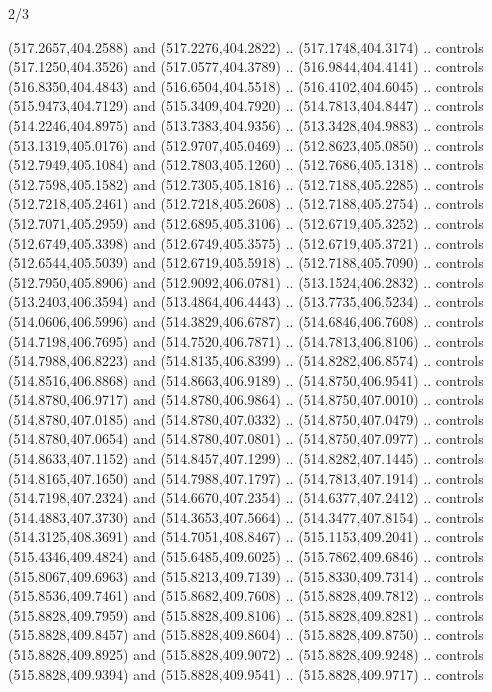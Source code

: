 \begin{flagdescription}{2/3}
\begin{scope}[xshift=0.5\flaglength,yshift=0.5\flagwidth,scale=\flagwidth/495.65]
\begin{scope}[y=0.8pt, x=0.8pt, yscale=-1,shift={(-463.76,-309.78)}]
  (517.2657,404.2588) and (517.2276,404.2822) .. (517.1748,404.3174) .. controls
  (517.1250,404.3526) and (517.0577,404.3789) .. (516.9844,404.4141) .. controls
  (516.8350,404.4843) and (516.6504,404.5518) .. (516.4102,404.6045) .. controls
  (515.9473,404.7129) and (515.3409,404.7920) .. (514.7813,404.8447) .. controls
  (514.2246,404.8975) and (513.7383,404.9356) .. (513.3428,404.9883) .. controls
  (513.1319,405.0176) and (512.9707,405.0469) .. (512.8623,405.0850) .. controls
  (512.7949,405.1084) and (512.7803,405.1260) .. (512.7686,405.1318) .. controls
  (512.7598,405.1582) and (512.7305,405.1816) .. (512.7188,405.2285) .. controls
  (512.7218,405.2461) and (512.7218,405.2608) .. (512.7188,405.2754) .. controls
  (512.7071,405.2959) and (512.6895,405.3106) .. (512.6719,405.3252) .. controls
  (512.6749,405.3398) and (512.6749,405.3575) .. (512.6719,405.3721) .. controls
  (512.6544,405.5039) and (512.6719,405.5918) .. (512.7188,405.7090) .. controls
  (512.7950,405.8906) and (512.9092,406.0781) .. (513.1524,406.2832) .. controls
  (513.2403,406.3594) and (513.4864,406.4443) .. (513.7735,406.5234) .. controls
  (514.0606,406.5996) and (514.3829,406.6787) .. (514.6846,406.7608) .. controls
  (514.7198,406.7695) and (514.7520,406.7871) .. (514.7813,406.8106) .. controls
  (514.7988,406.8223) and (514.8135,406.8399) .. (514.8282,406.8574) .. controls
  (514.8516,406.8868) and (514.8663,406.9189) .. (514.8750,406.9541) .. controls
  (514.8780,406.9717) and (514.8780,406.9864) .. (514.8750,407.0010) .. controls
  (514.8780,407.0185) and (514.8780,407.0332) .. (514.8750,407.0479) .. controls
  (514.8780,407.0654) and (514.8780,407.0801) .. (514.8750,407.0977) .. controls
  (514.8633,407.1152) and (514.8457,407.1299) .. (514.8282,407.1445) .. controls
  (514.8165,407.1650) and (514.7988,407.1797) .. (514.7813,407.1914) .. controls
  (514.7198,407.2324) and (514.6670,407.2354) .. (514.6377,407.2412) .. controls
  (514.4883,407.3730) and (514.3653,407.5664) .. (514.3477,407.8154) .. controls
  (514.3125,408.3691) and (514.7051,408.8467) .. (515.1153,409.2041) .. controls
  (515.4346,409.4824) and (515.6485,409.6025) .. (515.7862,409.6846) .. controls
  (515.8067,409.6963) and (515.8213,409.7139) .. (515.8330,409.7314) .. controls
  (515.8536,409.7461) and (515.8682,409.7608) .. (515.8828,409.7812) .. controls
  (515.8828,409.7959) and (515.8828,409.8106) .. (515.8828,409.8281) .. controls
  (515.8828,409.8457) and (515.8828,409.8604) .. (515.8828,409.8750) .. controls
  (515.8828,409.8925) and (515.8828,409.9072) .. (515.8828,409.9248) .. controls
  (515.8828,409.9394) and (515.8828,409.9541) .. (515.8828,409.9717) .. controls

\end{scope}
\end{scope}
\end{flagdescription}
